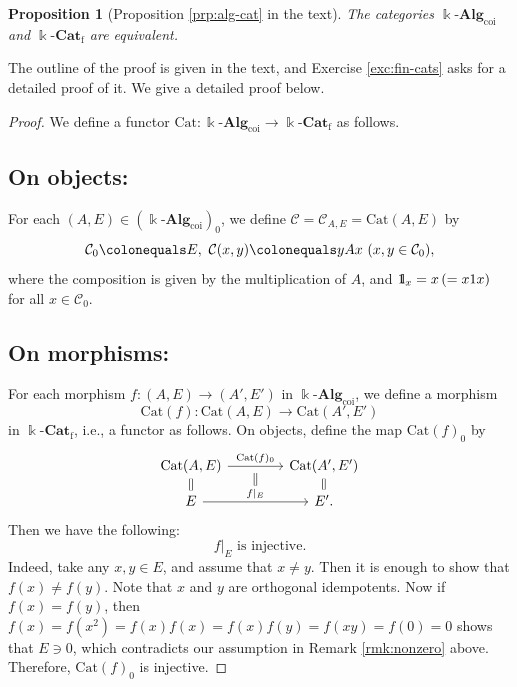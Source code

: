 \documentclass{surv-l}
\numberwithin{equation}{chapter}
\numberwithin{figure}{chapter}
\theoremstyle{plain}
\newtheorem{prp}[thm]{Proposition}
\theoremstyle{definition}
\theoremstyle{remark}
\newcommand{\id}{1\kern-.25em{\text{{\rm l}}}}
\newcommand{\kCat}{\Bbbk\text{-}\mathbf{Cat}}
\newcommand{\Ar}[3]{\ar[from={#1}, to={#2}, #3]}
\begin{document}
\begin{prp}[Proposition \ref{prp:alg-cat} in the text]
The categories $\Bbbk\text{-}\mathbf{Alg}_{\mathrm{coi}}$ and $\kCat_{\mathrm{f}}$ are equivalent.
\end{prp}

The outline of the proof is given in the text, and Exercise \ref{exc:fin-cats} asks for a detailed proof of it.
We give a detailed proof below.

\begin{proof}\hspace{1pt}
We define a functor $\mathrm{Cat} \colon \Bbbk\text{-}\mathbf{Alg}_{\mathrm{coi}} \to \kCat_{\mathrm{f}}$ as follows.


\subsection*{On objects:}
For each $(A, E) \in (\Bbbk\text{-}\mathbf{Alg}_{\mathrm{coi}})_0$, we define
${\mathcal{C}}= {\mathcal{C}}_{A,E} = \mathrm{Cat}(A,E)$ by
\[
{\mathcal{C}}_0\colonequals E,\  {\mathcal{C}}(x,y)\colonequals yAx\ (x,y\in {\mathcal{C}}_0),
\]
where
the composition is given by the multiplication of $A$, and
$\id_x = x \,( = x1x)$ for all $x \in {\mathcal{C}}_0$.


\subsection*{On morphisms:}
For each morphism $f \colon (A,E) \to (A',E')$ in $\Bbbk\text{-}\mathbf{Alg}_{\mathrm{coi}}$,
we define a morphism
\[
\mathrm{Cat}(f)\colon \mathrm{Cat}(A,E) \to \mathrm{Cat}(A',E')
\]
 in $\kCat_{\mathrm{f}}$, i.e., a functor as follows.
On objects, define the map $\mathrm{Cat}(f)_0$ by
\[
\begin{tikzcd}[column sep=40]
\mathrm{Cat}(A,E) & \mathrm{Cat}(A',E')\\[-10pt]
E & E'.
\Ar{1-1}{1-2}{"\mathrm{Cat}(f)_0", ""' name=a}
\Ar{2-1}{2-2}{"f|_E" name=b}
\Ar{1-1}{2-1}{equal}
\Ar{1-2}{2-2}{equal}
\Ar{a}{b}{equal}
\end{tikzcd}
\]
Then we have the following:
\begin{equation}\label{eq:mon}
f|_E \text{ is injective.}
\end{equation}
Indeed,
take any $x,y \in E$, and assume that $x \ne y$.
Then it is enough to show that $f(x) \ne f(y)$.
Note that $x$ and $y$ are orthogonal idempotents.
Now if $f(x) = f(y)$, then
$f(x) = f(x^2) = f(x)f(x) = f(x)f(y) = f(xy) = f(0) = 0$ shows that
$E \ni 0$, which contradicts our assumption in Remark \ref{rmk:nonzero} above.
Therefore, $\mathrm{Cat}(f)_0$ is injective.


\end{proof}
\end{document}
